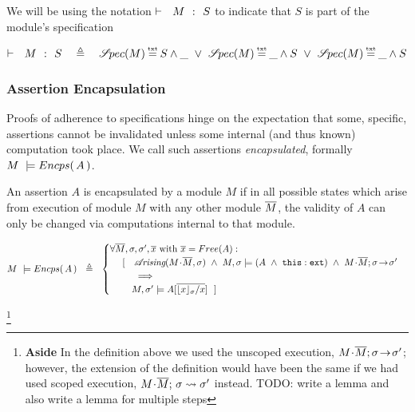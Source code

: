 We will be using the notation ${\vdash \ \ M\ \ \mathbf{:}\ \ S}$ to indicate that $S$ is part of the module's specification

\begin{definition}
\label{d:encaps}
 $\promises M S\ \ \ \triangleq\ \ \ \SpecOf M \txteq  S \wedge \_  \ \vee\  \SpecOf M \txteq \_ \wedge S   \ \vee\ \SpecOf M \txteq \_ \wedge S $
 \end{definition} 

\subsubsection {Assertion Encapsulation}
\label{s:encaps-proof}

{
Proofs of adherence to {\SpecLang specifications  hinge on the expectation that some, 
specific, assertions cannot be invalidated unless some 
} internal (and thus known) computation took place. 
{We call such assertions   \emph{encapsulated},}
}
formally $M\ \models  {\ensuremath Encps(\, A\, )}$.
 


{An assertion $A$  is  encapsulated by a module $M$  if in all possible states which arise from execution of module $M$ with any other  module $\overline{M}$, the validity of $A$}  {can only be changed via computations internal to that module}.
 

\begin{definition} $~$ \\
\label{def:encapsulation}
$ %
    M\ \models \encaps{A}\ \   \triangleq  \ \   
    \begin{cases}
     \forall \Mtwo, \sigma, \sigma', \overline{x} \mbox{ with } \overline{x}=Free(A):\\
   \ \ \ \  [\ \ \  \arising{M\madd\Mtwo}{\sigma}\ \wedge \  \satisfiesA{M}{\sigma}{(A \ \wedge\ \external {\prg{this}})}\  \wedge\  \leadstoOrig  {M\madd\Mtwo}  {\sigma}{\sigma'}\\
    \ \ \ \ \ \   \ \ \ \Longrightarrow\\
    \ \ \ \ \ \  \  {M},{\sigma'}\models{A[{\overline {{\interpret \sigma x}/x}}]} \ \  ]
    \end{cases}
 $%
  \end{definition}
 \footnote{\textbf{Aside} In the definition above we used the unscoped execution,  $M\!\cdot\!\overline{M};\sigma\! \rightarrow\! {\sigma'}$;  however, the extension of the definition would have been the same if we had used scoped execution, $M\!\cdot\!\overline{M};\, {\sigma} \rightsquigarrow \sigma'$ instead. TODO: write a lemma and also write a lemma for multiple steps}
 
